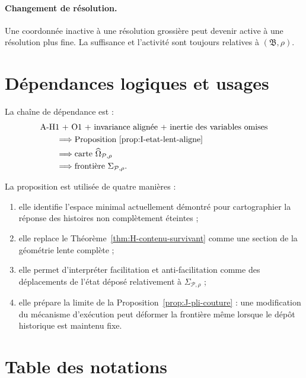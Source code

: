\paragraph{Changement de résolution.}
Une coordonnée inactive à une résolution grossière peut devenir active
à une résolution plus fine. La suffisance et l'activité sont toujours
relatives à $(\mathfrak B,\rho)$.

\section{Dépendances logiques et usages}
\label{annexe-I-dependances}

La chaîne de dépendance est :
\[
\begin{aligned}
&\text{A-H1 + O1 + invariance alignée + inertie des variables omises}\\
&\qquad\Longrightarrow \text{Proposition~\ref{prop:I-etat-lent-aligne}}\\
&\qquad\Longrightarrow \text{carte }\widehat\Omega_{\mathcal P,\rho}\\
&\qquad\Longrightarrow \text{frontière }\Sigma_{\mathcal P,\rho}.
\end{aligned}
\]

La proposition est utilisée de quatre manières :
\begin{enumerate}
\item elle identifie l'espace minimal actuellement démontré pour
  cartographier la réponse des histoires non complètement éteintes ;
\item elle replace le Théorème~\ref{thm:H-contenu-survivant} comme une section de la géométrie
  lente complète ;
\item elle permet d'interpréter facilitation et anti-facilitation comme
  des déplacements de l'état déposé relativement à
  $\Sigma_{\mathcal P,\rho}$ ;
\item elle prépare la limite de la Proposition~\ref{prop:J-pli-couture} : une modification du mécanisme
  d'exécution peut déformer la frontière même lorsque le dépôt historique
  est maintenu fixe.
\end{enumerate}

\section{Table des notations}
\label{annexe-I-notations}

